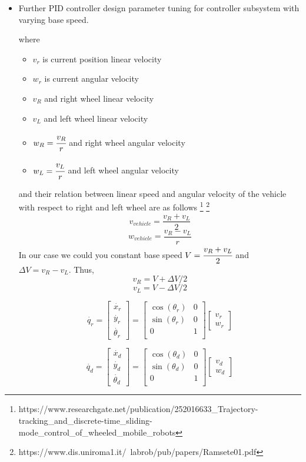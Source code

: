 \documentclass[a4paper,12pt]{article}
\begin{document}
\begin{itemize}

\item Further PID controller design parameter tuning for controller subsystem with varying base speed.


\newpage

\begin{appendices} 

where 
\begin{itemize}
	\item $v_r$ is current position linear velocity 
	\item $w_r$ is current angular velocity 
	\item $v_R$ and right wheel linear velocity
	\item $v_L$ and left wheel linear velocity
	\item $w_R=\cfrac{v_R}{r}$ and right wheel angular velocity
	\item $w_L=\cfrac{v_L}{r}$ and left wheel angular velocity
\end{itemize}
and their relation between linear speed and angular velocity of the vehicle with respect to right and left wheel are as follows \footnote{https://www.researchgate.net/publication/252016633\_Trajectory-tracking\_and\_discrete-time\_sliding-mode\_control\_of\_wheeled\_mobile\_robots}
 \footnote{https://www.dis.uniroma1.it/~labrob/pub/papers/Ramsete01.pdf}
$$ v_{vehicle}=\frac{v_R+v_L}{2} $$
$$ w_{vehicle}=\frac{v_R-v_L}{r} $$
In our case we could you constant base speed $V=\cfrac{v_R+v_L}{2}$ and $\Delta V=v_R-v_L$.
Thus, 
$$ v_R=V+\Delta V/2$$
$$ v_L=V-\Delta V/2$$ 


$$ \dot{q_r}=
	\begin{bmatrix} \dot{x_r} \\ \dot{y_r} \\ \dot{\theta_r}  \end{bmatrix}
 	=
  	\begin{bmatrix}
   	\cos (\theta_r) & 0 \\
   	\sin (\theta_r) & 0 \\
    0 & 1 \\
   	\end{bmatrix}
	\begin{bmatrix} v_r \\ w_r \end{bmatrix}
$$ 

$$ \dot{q_d}=
	\begin{bmatrix} \dot{x_d} \\ \dot{y_d} \\ \dot{\theta_d}  \end{bmatrix}
 	=
  	\begin{bmatrix}
   	\cos (\theta_d) & 0 \\
   	\sin (\theta_d) & 0 \\
    0 & 1 \\
   	\end{bmatrix}
	\begin{bmatrix} v_d \\ w_d \end{bmatrix}
$$


\end{appendices}
\end{itemize}
\end{document}

